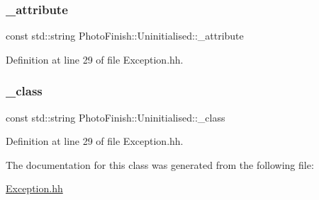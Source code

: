 \subsubsection{\texorpdfstring{\+\_\+attribute}{\_attribute}}
{\footnotesize\ttfamily const std\+::string Photo\+Finish\+::\+Uninitialised\+::\+\_\+attribute\hspace{0.3cm}{\ttfamily [protected]}}



Definition at line 29 of file Exception.\+hh.

\mbox{\label{class_photo_finish_1_1_uninitialised_aa01e789c88f361ad1131588d25f8dbd2}} 
\subsubsection{\texorpdfstring{\+\_\+class}{\_class}}
{\footnotesize\ttfamily const std\+::string Photo\+Finish\+::\+Uninitialised\+::\+\_\+class\hspace{0.3cm}{\ttfamily [protected]}}



Definition at line 29 of file Exception.\+hh.



The documentation for this class was generated from the following file\+:\begin{DoxyCompactItemize}
\item 
\hyperlink{_exception_8hh}{Exception.\+hh}\end{DoxyCompactItemize}

